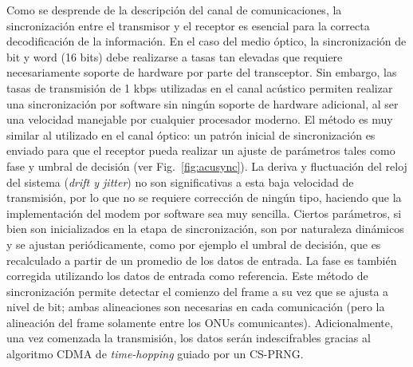 Como se desprende de la descripción del canal de comunicaciones, la sincronización entre el transmisor y el receptor es esencial para la correcta decodificación de la información. 
En el caso del medio óptico, la sincronización de bit y word (16 bits) debe realizarse a tasas tan elevadas que requiere necesariamente soporte de hardware por parte del transceptor.
Sin embargo, las tasas de transmisión de 1 kbps utilizadas en el canal acústico permiten realizar una sincronización por software sin ningún soporte de hardware adicional, al ser una velocidad manejable por cualquier procesador moderno.
El método es muy similar al utilizado en el canal óptico: un patrón inicial de sincronización es enviado para que el receptor pueda realizar un ajuste de parámetros tales como fase y umbral de decisión (ver Fig.~\ref{fig:acusync}). La deriva y fluctuación del reloj del sistema (\textit{drift y jitter}) no son significativas a esta baja velocidad de transmisión, por lo que no se requiere corrección de ningún tipo, haciendo que la implementación del modem por software sea muy sencilla.
Ciertos parámetros, si bien son inicializados en la etapa de sincronización, son por naturaleza dinámicos y se ajustan periódicamente, como por ejemplo el umbral de decisión, que es recalculado a partir de un promedio de los datos de entrada. La fase es también corregida utilizando los datos de entrada como referencia. Este método de sincronización permite detectar el comienzo del frame a su vez que se ajusta a nivel de bit; ambas alineaciones son necesarias en cada comunicación (pero la alineación del frame solamente entre los ONUs comunicantes). Adicionalmente, una vez comenzada la transmisión, los datos serán indescifrables gracias al algoritmo CDMA de \textit{time-hopping} guiado por un CS-PRNG.




